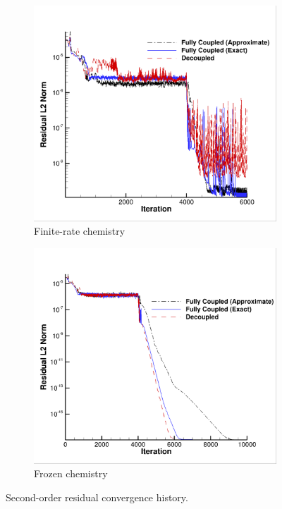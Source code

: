 \begin{figure}[h]
  \centering
	\begin{subfigure}[b]{0.45\textwidth}
    \includegraphics[width=\textwidth]{figures/flow-efficiency/dc-gfc-res-chem.png}
    \caption{Finite-rate chemistry}
    \label{fig:srp-dc-gfc-res-frozen}
  \end{subfigure}
	\begin{subfigure}[b]{0.45\textwidth}
    \includegraphics[width=\textwidth]{figures/flow-efficiency/dc-gfc-res-frozen.png}
    \caption{Frozen chemistry}
    \label{fig:srp-dc-gfc-res-chem}
  \end{subfigure}
  \caption{Second-order residual convergence history.}
  \label{fig:srp-dc-gfc-res}
\end{figure}
